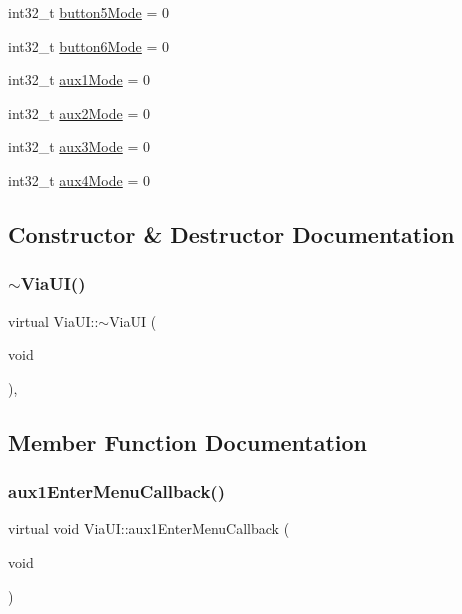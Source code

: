 \begin{DoxyCompactItemize}
\item 
int32\+\_\+t \mbox{\hyperlink{class_via_u_i_a81ebe08ffb4b0318317d859291314fb8}{button5\+Mode}} = 0
\item 
int32\+\_\+t \mbox{\hyperlink{class_via_u_i_a9421e095ab94090aceed254332b535f9}{button6\+Mode}} = 0
\item 
int32\+\_\+t \mbox{\hyperlink{class_via_u_i_aaab0b4a294ded73b9ac59d387a94b854}{aux1\+Mode}} = 0
\item 
int32\+\_\+t \mbox{\hyperlink{class_via_u_i_ae52e25594e34359538ee1de8d3710dfc}{aux2\+Mode}} = 0
\item 
int32\+\_\+t \mbox{\hyperlink{class_via_u_i_a3959f2ca0cf9cf711d5a63c15ec922f7}{aux3\+Mode}} = 0
\item 
int32\+\_\+t \mbox{\hyperlink{class_via_u_i_aef749bb156d3aace85d80bde2f847651}{aux4\+Mode}} = 0
\end{DoxyCompactItemize}


\subsection{Constructor \& Destructor Documentation}
\mbox{\label{class_via_u_i_ad60e005bc6a105009be39325664e5a32}} 
\subsubsection{\texorpdfstring{$\sim$\+Via\+U\+I()}{~ViaUI()}}
{\footnotesize\ttfamily virtual Via\+U\+I\+::$\sim$\+Via\+UI (\begin{DoxyParamCaption}\item[{void}]{ }\end{DoxyParamCaption})\hspace{0.3cm}{\ttfamily [inline]}, {\ttfamily [virtual]}}



\subsection{Member Function Documentation}
\mbox{\label{class_via_u_i_a578111861e912bf43d3f320a0faffb0f}} 
\subsubsection{\texorpdfstring{aux1\+Enter\+Menu\+Callback()}{aux1EnterMenuCallback()}}
{\footnotesize\ttfamily virtual void Via\+U\+I\+::aux1\+Enter\+Menu\+Callback (\begin{DoxyParamCaption}\item[{void}]{ }\end{DoxyParamCaption})\hspace{0.3cm}{\ttfamily [pure virtual]}}



